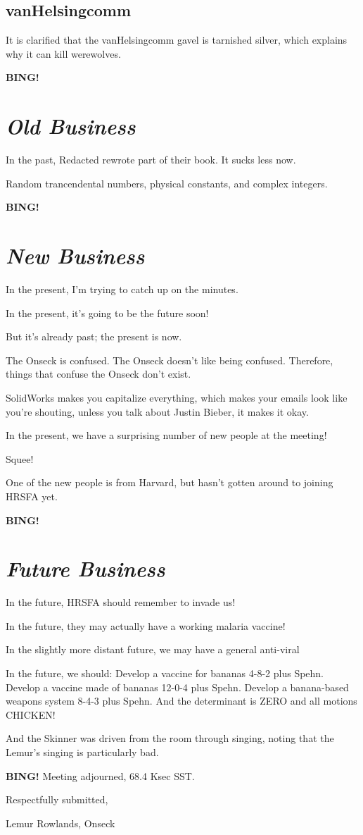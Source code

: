 \documentclass[10pt]{article}
\newcommand{\bing}{{\bf BING!} }
\newcommand{\goto}[1]{\bing \vskip 12pt \section*{{\em{#1}}}}
\newcommand{\ps}{ plus Spehn\xspace}
\newcommand{\onseck}{Lemur Rowlands, Onseck}
\begin{document}
\subsection*{vanHelsingcomm}

It is clarified that the vanHelsingcomm gavel is tarnished silver, which
explains why it can kill werewolves.

\goto{Old Business}

In the past, Redacted rewrote part of their book.  It sucks less now.

Random trancendental numbers, physical constants, and complex integers.

\goto{New Business}

In the present, I'm trying to catch up on the minutes.

In the present, it's going to be the future soon!

But it's already past; the present is now.

The Onseck is confused.  The Onseck doesn't like being confused.
Therefore, things that confuse the Onseck don't exist.

SolidWorks makes you capitalize everything, which makes your emails
look like you're shouting, unless you talk about Justin Bieber, it
makes it okay.

In the present, we have a surprising number of new people at the meeting!

Squee!

One of the new people is from Harvard, but hasn't gotten around
to joining HRSFA yet.

\goto{Future Business}

In the future, HRSFA should remember to invade us!

In the future, they may actually have a working malaria vaccine!

In the slightly more distant future, we may have a general anti-viral

In the future, we should:
	Develop a vaccine for bananas 4-8-2\ps.
	Develop a vaccine made of bananas 12-0-4\ps.
	Develop a banana-based weapons system 8-4-3\ps.
And the determinant is ZERO and all motions CHICKEN!

And the Skinner was driven from the room through singing,
noting that the Lemur's singing is particularly bad.

\bing
\noindent
Meeting adjourned, 68.4 Ksec SST.

\vspace{18pt}

\centerline{Respectfully submitted,}
\centerline{\onseck}
\end{document}
